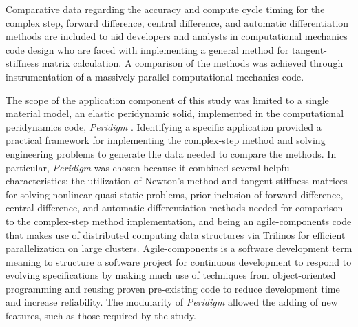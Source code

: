 \documentclass[preprint,12pt]{elsarticle}
\begin{document}
Comparative data regarding the accuracy and compute cycle timing for the
complex step, forward difference, central difference, and automatic differentiation methods are included to aid developers and analysts in computational mechanics code design who are faced with implementing a general
method for tangent-stiffness matrix calculation.  A comparison of the methods was achieved through instrumentation of a massively-parallel computational mechanics code. 

The scope of the application component of this study was limited to a single material model, an elastic peridynamic solid, implemented in the computational peridynamics code, \textit{Peridigm} \cite{peridigm}. Identifying a specific application provided a practical framework for implementing the   complex-step method and solving engineering problems to generate the data needed to compare the methods. In particular, \emph{Peridigm} was chosen because it combined several helpful characteristics: the utilization of Newton's method and tangent-stiffness matrices for solving nonlinear quasi-static problems, prior inclusion of forward difference, central difference, and automatic-differentiation methods needed for comparison to the complex-step method implementation, and being an agile-components code that makes use of distributed computing data structures via Trilinos \cite{trilinos} for efficient parallelization on large clusters. Agile-components is a software development term meaning to structure a software project for continuous development to respond to evolving specifications by making much use of techniques from object-oriented programming and reusing proven pre-existing code to reduce development time and increase reliability. The modularity of \emph{Peridigm} allowed the adding of new features, such as those required by the study.
\end{document}
